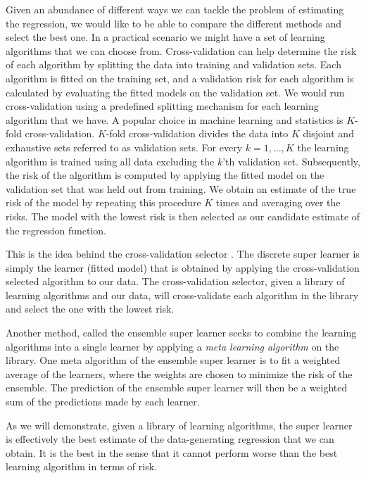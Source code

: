 \documentclass[11pt, a4paper]{article}
\theoremstyle{definition}
\theoremstyle{remark}
\begin{document}
Given an abundance of different ways we can tackle the problem of estimating the regression, we would like to be able to compare the different methods and select the best one. In a practical scenario we might have a set of learning algorithms that we can choose from. Cross-validation can help determine the risk of each algorithm by splitting the data into training and validation sets. Each algorithm is fitted on the training set, and a validation risk for each algorithm is calculated by evaluating the fitted models on the validation set. We would run cross-validation using a predefined splitting mechanism for each learning algorithm that we have. A popular choice in machine learning and statistics is $ K $-fold cross-validation. $ K $-fold cross-validation divides the data into $ K $ disjoint and exhaustive sets referred to as validation sets. For every $ k = 1, \dots , K $ the learning algorithm is trained using all data excluding the $ k $'th validation set. Subsequently, the risk of the algorithm is computed by applying the fitted model on the validation set that was held out from training. We obtain an estimate of the true risk of the model by repeating this procedure $ K $ times and averaging over the risks. The model with the lowest risk is then selected as our candidate estimate of the regression function. 

This is the idea behind the cross-validation selector \parencite{laan03}. The discrete super learner \parencite{van2007super} is simply the learner (fitted model) that is obtained by applying the cross-validation selected algorithm to our data. The cross-validation selector, given a library of learning algorithms and our data, will cross-validate each algorithm in the library and select the one with the lowest risk. 

Another method, called the ensemble super learner \parencite{van2007super} seeks to combine the learning algorithms into a single learner by applying a \textit{meta learning algorithm} on the library. One meta algorithm of the ensemble super learner is to fit a weighted average of the learners, where the weights are chosen to minimize the risk of the ensemble. The prediction of the ensemble super learner will then be a weighted sum of the predictions made by each learner.

As we will demonstrate, given a library of learning algorithms, the super learner is effectively the best estimate of the data-generating regression that we can obtain. It is the best in the sense that it cannot perform worse than the best learning algorithm in terms of risk. 
\end{document}
